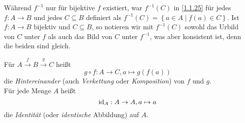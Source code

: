 \documentclass[../../main.tex]{subfiles}
\begin{document}
\begin{bem}\label{1.2.3}
Während $f^{-1}$ nur für bijektive $f$ existiert, war $f^{-1}(C)$ in \ref{1.1.25} für jedes $f:A\rightarrow B$ und jedes $C\subseteq B$ definiert als $f^{-1}(C) = \left\{a\in A\mid f(a)\in C\right\}$. Ist $f:A\rightarrow B$ bijektiv und $C\subseteq B$, so notieren wir mit $f^{-1}(C)$ sowohl das Urbild von $C$ unter $f$ als auch das Bild von $C$ unter $f^{-1}$, was aber konsistent ist, denn die beiden sind gleich.
\end{bem}

\begin{df}\label{1.2.4}
Für $A\overset f\rightarrow B\overset g\rightarrow C$ heißt \[g\circ f:A\rightarrow C, a\mapsto g(f(a))\] die \emph{Hintereinander} (auch \emph{Verkettung} oder \emph{Komposition}) von $f$ und $g$.\\
Für jede Menge $A$ heißt
\[\operatorname{id}_A: A\rightarrow A,a\mapsto a\]
die \emph{Identität} (oder \emph{identische} Abbildung) auf $A$.
\end{df}
\end{document}
